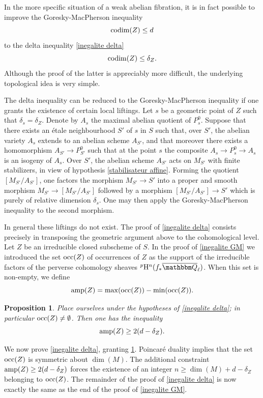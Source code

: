 \documentclass[12pt,english]{smfart}
\numberwithin{equation}{subsection}
\newtheorem{proposition}[equation]{Proposition}
\theoremstyle{remark}
\newcommand\QQ{{\mathbbm Q}}
\newcommand\rmH{{\rm H}}
\newcommand\Ql{{\overline\QQ_\ell}}
\begin{document}
In the more specific situation of a weak abelian fibration, it is in fact possible to improve the Goresky-MacPherson inequality
$${\rm codim}(Z)\leq d$$
to the delta inequality \ref{inegalite delta}
$${\rm codim}(Z)\leq \delta_Z.$$
Although the proof of the latter is appreciably more difficult, the underlying topological idea is very simple.

The delta inequality can be reduced to the Goresky-MacPherson inequality if one grants the existence of certain local liftings. Let $s$ be a geometric point of $Z$ such that $\delta_s=\delta_Z$. Denote by $A_s$ the maximal abelian quotient of $P^0_s$. Suppose that there exists an \'etale neighbourhood $S'$ of $s$ in $S$ such that, over $S'$, the abelian variety $A_s$ extends to an abelian scheme $A_{S'}$, and that moreover there exists a homomorphism $A_{S'}\rightarrow P^0_{S'}$ such that at the point $s$ the composite $A_s\rightarrow P^0_s\rightarrow A_s$ is an isogeny of $A_s$. Over $S'$, the abelian scheme $A_{S'}$ acts on $M_{S'}$ with finite stabilizers, in view of hypothesis \ref{stabilisateur affine}. Forming the quotient $[M_{S'}/A_{S'}]$, one factors the morphism $M_{S'}\rightarrow S'$ into a proper and smooth morphism $M_{S'}\rightarrow [M_{S'}/A_{S'}]$ followed by a morphism $[M_{S'}/A_{S'}]\rightarrow S'$ which is purely of relative dimension $\delta_s$. One may then apply the Goresky-MacPherson inequality to the second morphism.

In general these liftings do not exist. The proof of \ref{inegalite delta} consists precisely in transposing the geometric argument above to the cohomological level.
Let $Z$ be an irreducible closed subscheme of $S$. In the proof of \ref{inegalite GM} we introduced the set ${\rm occ}(Z)$ of occurrences of $Z$ as the support of the irreducible factors of the perverse cohomology sheaves ${}^p\rmH^n(f_*\Ql)$. When this set is non-empty, we define
$${\rm amp}(Z)={\rm max}({\rm occ}(Z))-{\rm min}({\rm occ}(Z)).$$
\begin{proposition}\label{inegalite amplitude}
Place ourselves under the hypotheses of \ref{inegalite delta}; in particular ${\rm occ}(Z)\not=\emptyset$. Then one has the inequality
$${\rm amp}(Z)\geq 2(d-\delta_Z).$$
\end{proposition}

We now prove \ref{inegalite delta}, granting \ref{inegalite amplitude}. Poincar\'e duality implies that the set ${\rm occ}(Z)$ is symmetric about $\dim(M)$. The additional constraint ${\rm amp}(Z)\geq 2(d-\delta_Z)$ forces the existence of an integer $n\geq \dim(M)+d-\delta_Z$ belonging to ${\rm occ}(Z)$. The remainder of the proof of \ref{inegalite delta} is now exactly the same as the end of the proof of \ref{inegalite GM}.
\end{document}
